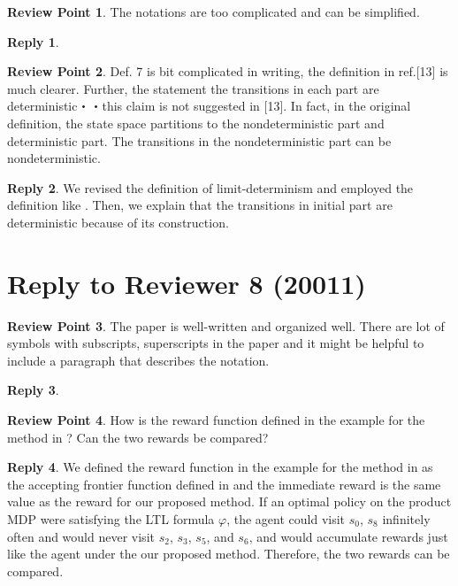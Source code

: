 \documentclass[10 pt, dvipdfmx]{article}
\theoremstyle{definition}
\newtheorem{review point}{Review Point}[section]
\newtheorem*{reply}{Reply}
\begin{document}
\begin{review point}
  The notations are too complicated and can be simplified.
\end{review point}

\begin{reply}

\end{reply}

\begin{review point}
  Def. 7 is bit complicated in writing, the definition in ref.[13] is
much clearer. Further, the statement the transitions in each part are
deterministic・・this claim is not suggested in [13]. In fact, in the
original definition, the state space partitions to the nondeterministic
part and deterministic part. The transitions in the nondeterministic
part can be nondeterministic.
\end{review point}

\begin{reply}
  We revised the definition of limit-determinism and employed the definition like \cite{SEJK2016}. Then, we explain that the transitions in initial part are deterministic because of its construction.
\end{reply}

\section{Reply to Reviewer 8 (20011)}

\begin{review point}
  The paper is well-written and organized well. There are lot of
symbols with subscripts, superscripts in the paper and it might be
helpful to include a paragraph that describes the notation.
\end{review point}

\begin{reply}

\end{reply}

\begin{review point}
  How is the reward function defined in the example for the method in
\cite{HAK2019}? Can the two rewards be compared?
\end{review point}

\begin{reply}
  We defined the reward function in the example for the method in \cite{HAK2019} as the accepting frontier function defined in \cite{HAK2019} and the immediate reward is the same value as the reward for our proposed method. If an optimal policy on the product MDP were satisfying the LTL formula $\varphi$, the agent could visit $s_0$, $s_8$ infinitely often and would never visit $s_2$, $s_3$, $s_5$, and $s_6$, and would accumulate rewards just like the agent under the our proposed method. Therefore, the two rewards can be compared.
\end{reply}
\end{document}
